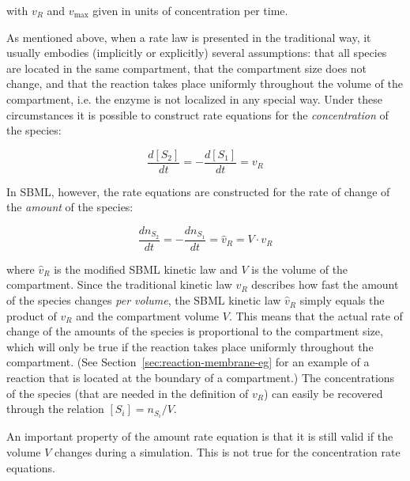 with $v_{R}$ and $v_\text{max}$ given in units of concentration
per time.

As mentioned above, when a rate law is presented in the
traditional way, it usually embodies (implicitly or explicitly)
several assumptions: that all species are located in the same
compartment, that the compartment size does not change, and that
the reaction takes place uniformly throughout the volume of the
compartment, i.e. the enzyme is not localized in any special way.
Under these circumstances it is possible to construct rate
equations for the \emph{concentration} of the species:
\begin{linenomath}
  \begin{equation*}
    \frac{d[S_{2}]}{dt} = -\frac{d[S_{1}]}{dt} = v_{R}
  \end{equation*}
\end{linenomath}
In SBML, however, the rate equations are constructed for the rate
of change of the \emph{amount} of the species:
\begin{linenomath}
  \begin{equation*}
    \frac{dn_{S_{2}}}{dt} = -\frac{dn_{S_{1}}}{dt} = \hat{v}_{R} = V \cdot v_{R}
  \end{equation*}
\end{linenomath}
where $\hat{v}_{R}$ is the modified SBML kinetic law and $V$ is
the volume of the compartment.  Since the traditional kinetic law
$v_{R}$ describes how fast the amount of the species changes
\emph{per volume}, the SBML kinetic law $\hat{v}_{R}$ simply
equals the product of $v_{R}$ and the compartment volume $V$. This
means that the actual rate of change of the amounts of the species
is proportional to the compartment size, which will only be true
if the reaction takes place uniformly throughout the compartment.
(See Section~\ref{sec:reaction-membrane-eg} for an example of a
reaction that is located at the boundary of a compartment.)  The
concentrations of the species (that are needed in the definition
of $v_{R}$) can easily be recovered through the relation
$[S_{i}]=n_{S_{i}}/V$.

An important property of the amount rate equation is that it is still
valid if the volume $V$ changes during a simulation. This is not
true for the concentration rate equations. 

